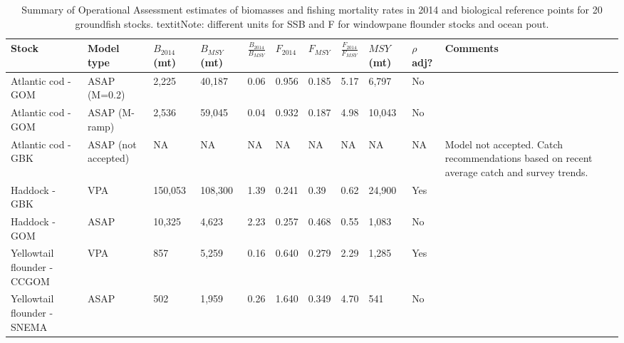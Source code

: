 
\begin{sidewaystable}[ht]
\captionsetup{width=\textwidth}
\centering
\caption{Summary of Operational Assessment estimates of biomasses and fishing mortality rates in 2014 and biological reference points for 20 groundfish stocks. textit{Note: different units for SSB and F for windowpane flounder stocks and ocean pout.}}
\label{BFEstimates}
{\small	
	\begin{tabular}{ 
	m{2cm}@{\hspace{.1cm}}
	M@{\hspace{.1cm}}
	L@{\hspace{.1cm}}   
	L@{\hspace{.2cm}}
	N@{\hspace{.2cm}}   
	L@{\hspace{.1cm}}
	L@{\hspace{.1cm}}
	L@{\hspace{.2cm}}
	L@{\hspace{.1cm}}
	L@{\hspace{.2cm}}
	M@{\hspace{0cm}}
	}
\hline
Stock & Model type & $B_{2014}$ (mt) & $B_{MSY}$ (mt) & $\frac{B_{2014}}{B_{MSY}}$ & $F_{2014}$ & $F_{MSY}$ & $\frac{F_{2014}}{F_{MSY}}$ & $MSY$ (mt) & $\rho$ adj? & Comments \\
\hline
Atlantic cod - GOM  & ASAP (M=0.2) &  2,225  &  40,187  & 0.06 & 0.956 & 0.185 & 5.17 &  6,797  & No & \\
Atlantic cod - GOM   & ASAP (M-ramp) &  2,536  &  59,045  & 0.04 & 0.932 & 0.187 & 4.98 &  10,043  & No & \\
Atlantic cod - GBK & ASAP (not accepted) &  NA  &  NA  & NA & NA & NA & NA &  NA  & NA & Model not accepted.  Catch recommendations based on recent average catch and survey trends.\\
Haddock - GBK & VPA &  150,053  &  108,300  & 1.39 & 0.241 & 0.39 & 0.62 &  24,900  & Yes & \\
Haddock - GOM & ASAP &  10,325  &  4,623  & 2.23 & 0.257 & 0.468 & 0.55 &  1,083  & No & \\
Yellowtail flounder - CCGOM & VPA &  857  &  5,259  & 0.16 & 0.640 & 0.279 & 2.29 &  1,285  & Yes & \\
Yellowtail flounder - SNEMA & ASAP &  502  &  1,959  & 0.26 & 1.640 & 0.349 & 4.70 &  541  & No & \\

\end{tabular}}
\end{sidewaystable}
